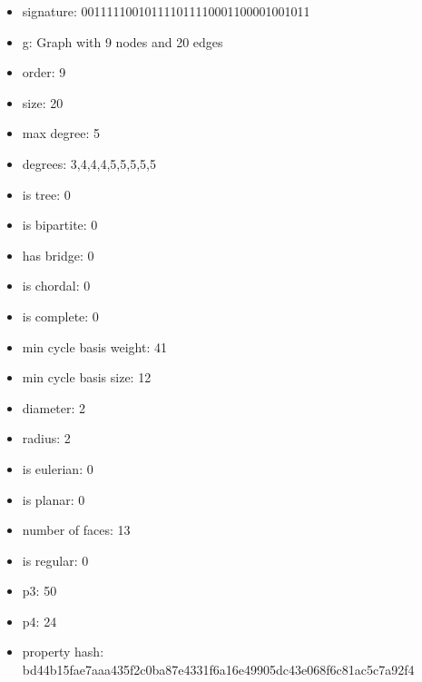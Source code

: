 \newpage
\begin{figure}
\end{figure}
\begin{itemize}
\item signature: 001111100101111011110001100001001011
\item g: Graph with 9 nodes and 20 edges
\item order: 9
\item size: 20
\item max degree: 5
\item degrees: 3,4,4,4,5,5,5,5,5
\item is tree: 0
\item is bipartite: 0
\item has bridge: 0
\item is chordal: 0
\item is complete: 0
\item min cycle basis weight: 41
\item min cycle basis size: 12
\item diameter: 2
\item radius: 2
\item is eulerian: 0
\item is planar: 0
\item number of faces: 13
\item is regular: 0
\item p3: 50
\item p4: 24
\item property hash: bd44b15fae7aaa435f2c0ba87e4331f6a16e49905dc43e068f6c81ac5c7a92f4
\end{itemize}
